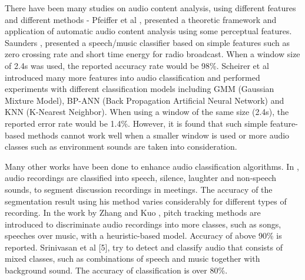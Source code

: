\documentclass{article}
\begin{document}
There have been many studies on audio content analysis, using different features and different methods \cite{lu2001robust} - Pfeiffer et al \cite{pfeiffer1997automatic}, presented a theoretic framework and application of automatic audio content analysis using some perceptual features. Saunders \cite{saunders1996real}, presented a speech/music classifier based on simple features such as zero crossing rate and short time energy for radio broadcast. When a window size of 2.4s was used, the reported accuracy rate would be 98\%. Scheirer et al \cite{scheirer1997construction} introduced many more features into audio classification and performed experiments with different classification models including GMM (Gaussian Mixture Model), BP-ANN (Back Propagation Artificial Neural Network) and KNN (K-Nearest Neighbor). When using a window of the same size (2.4s), the reported error rate would be 1.4\%. However, it is found that such simple feature-based methods cannot work well when a smaller window is used or more audio classes such as environment sounds are taken into consideration.  

Many other works have been done to enhance audio classification algorithms. In \cite{kimber1997acoustic}, audio recordings are classified into speech, silence, laughter and non-speech sounds, to segment discussion recordings in meetings. The accuracy of the segmentation result using his method varies considerably for different types of recording. In the work by Zhang and Kuo \cite{zhang1999video}, pitch tracking methods are introduced to discriminate audio recordings into more classes, such as songs, speeches over music, with a heuristic-based model. Accuracy of above 90\% is reported. Srinivasan et al [5], try to detect and classify audio that consists of mixed classes, such as combinations of speech and music together with background sound. The accuracy of classification is over 80\%. 
\end{document}

